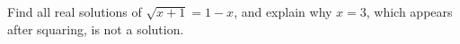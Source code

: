 Find all real solutions of $\sqrt{x+1}=1-x$, and explain why $x=3$, which appears after squaring, is not a solution.
